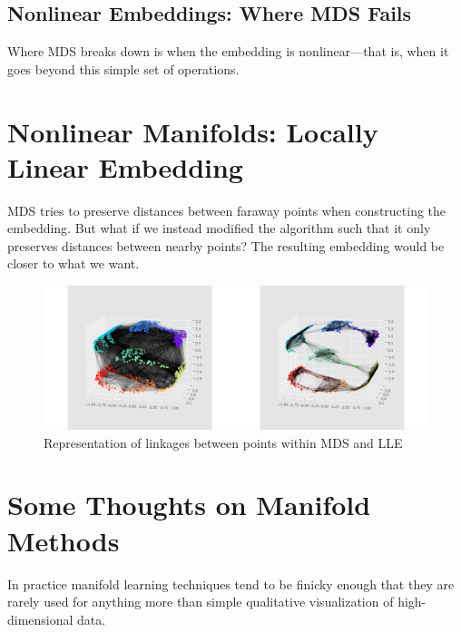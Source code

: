 \subsection{Nonlinear Embeddings: Where MDS Fails}
Where MDS breaks down is when the embedding is nonlinear—that is, when it goes beyond this simple set of operations.

\section{Nonlinear Manifolds: Locally Linear Embedding}
MDS tries to preserve distances between faraway points when constructing the embedding. But what if we instead modified the algorithm such that it
only preserves distances between nearby points? The resulting embedding would be
closer to what we want.

\begin{figure}
    \centering
    \includegraphics[width=\textwidth]{../Figures/fig46-7.png}
    \caption{Representation of linkages between points within MDS and LLE}
\end{figure}

\section{Some Thoughts on Manifold Methods}
In practice manifold learning techniques tend
to be finicky enough that they are rarely used for anything more than simple qualitative visualization of high-dimensional data.

